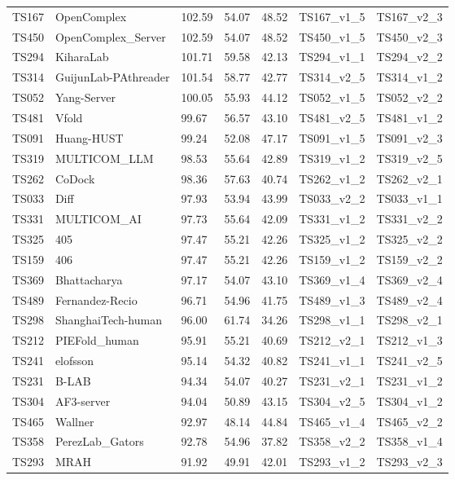 \begin{longtable}{lllllll}
TS167 & OpenComplex & 102.59 & 54.07 & 48.52 & TS167\_v1\_5 & TS167\_v2\_3 \\ 
TS450 & OpenComplex\_Server & 102.59 & 54.07 & 48.52 & TS450\_v1\_5 & TS450\_v2\_3 \\ 
TS294 & KiharaLab & 101.71 & 59.58 & 42.13 & TS294\_v1\_1 & TS294\_v2\_2 \\ 
TS314 & GuijunLab-PAthreader & 101.54 & 58.77 & 42.77 & TS314\_v2\_5 & TS314\_v1\_2 \\ 
TS052 & Yang-Server & 100.05 & 55.93 & 44.12 & TS052\_v1\_5 & TS052\_v2\_2 \\ 
TS481 & Vfold & 99.67 & 56.57 & 43.10 & TS481\_v2\_5 & TS481\_v1\_2 \\ 
TS091 & Huang-HUST & 99.24 & 52.08 & 47.17 & TS091\_v1\_5 & TS091\_v2\_3 \\ 
TS319 & MULTICOM\_LLM & 98.53 & 55.64 & 42.89 & TS319\_v1\_2 & TS319\_v2\_5 \\ 
TS262 & CoDock & 98.36 & 57.63 & 40.74 & TS262\_v1\_2 & TS262\_v2\_1 \\ 
TS033 & Diff & 97.93 & 53.94 & 43.99 & TS033\_v2\_2 & TS033\_v1\_1 \\ 
TS331 & MULTICOM\_AI & 97.73 & 55.64 & 42.09 & TS331\_v1\_2 & TS331\_v2\_2 \\ 
TS325 & 405 & 97.47 & 55.21 & 42.26 & TS325\_v1\_2 & TS325\_v2\_2 \\ 
TS159 & 406 & 97.47 & 55.21 & 42.26 & TS159\_v1\_2 & TS159\_v2\_2 \\ 
TS369 & Bhattacharya & 97.17 & 54.07 & 43.10 & TS369\_v1\_4 & TS369\_v2\_4 \\ 
TS489 & Fernandez-Recio & 96.71 & 54.96 & 41.75 & TS489\_v1\_3 & TS489\_v2\_4 \\ 
TS298 & ShanghaiTech-human & 96.00 & 61.74 & 34.26 & TS298\_v1\_1 & TS298\_v2\_1 \\ 
TS212 & PIEFold\_human & 95.91 & 55.21 & 40.69 & TS212\_v2\_1 & TS212\_v1\_3 \\ 
TS241 & elofsson & 95.14 & 54.32 & 40.82 & TS241\_v1\_1 & TS241\_v2\_5 \\ 
TS231 & B-LAB & 94.34 & 54.07 & 40.27 & TS231\_v2\_1 & TS231\_v1\_2 \\ 
TS304 & AF3-server & 94.04 & 50.89 & 43.15 & TS304\_v2\_5 & TS304\_v1\_2 \\ 
TS465 & Wallner & 92.97 & 48.14 & 44.84 & TS465\_v1\_4 & TS465\_v2\_2 \\ 
TS358 & PerezLab\_Gators & 92.78 & 54.96 & 37.82 & TS358\_v2\_2 & TS358\_v1\_4 \\ 
TS293 & MRAH & 91.92 & 49.91 & 42.01 & TS293\_v1\_2 & TS293\_v2\_3 \\ 

\end{longtable}
